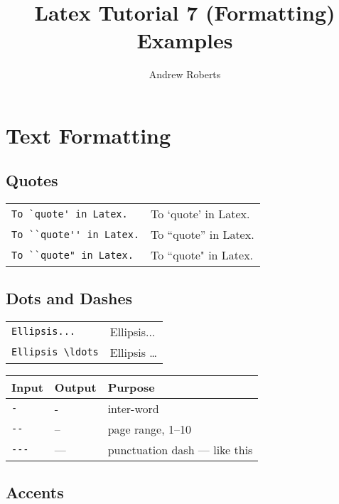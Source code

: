 \documentclass[english]{article}
\begin{document}
\normalem

\title{Latex Tutorial 7 (Formatting) Examples}
\author{Andrew Roberts}
\maketitle

\section{Text Formatting}

\subsection{Quotes}

\begin{tabular}{ l | l }

\verb|To `quote' in Latex.| & To `quote' in Latex. \\
\verb|To ``quote'' in Latex.| & To ``quote'' in Latex. \\
\verb|To ``quote" in Latex.| & To ``quote" in Latex. \\
\end{tabular}

\subsection{Dots and Dashes}

\begin{tabular}{l | l}
\verb|Ellipsis...| & Ellipsis... \\
\verb|Ellipsis \ldots| & Ellipsis \ldots \\
\end{tabular}

\vspace{\baselineskip}

\begin{tabular}{| l | l | l |}
\hline
Input & Output & Purpose \\ \hline
\verb|-| & - & inter-word \\
\verb|--| & -- & page range, 1--10 \\
\verb|---| & --- & punctuation dash --- like this \\
\hline

\end{tabular}

\subsection{Accents}
\end{document}
